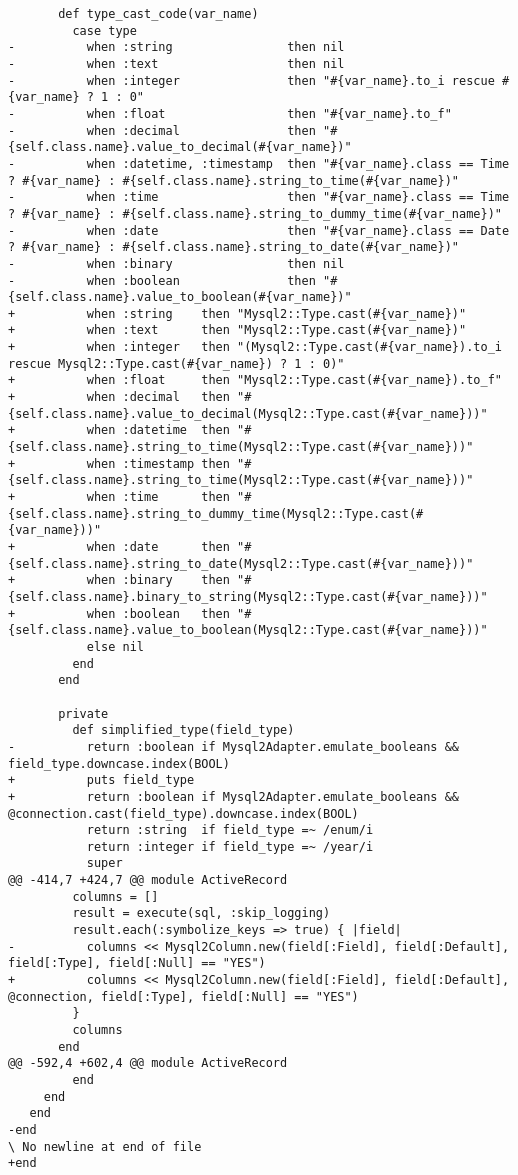 \begin{lstlisting}
       def type_cast_code(var_name)
         case type
-          when :string                then nil
-          when :text                  then nil
-          when :integer               then "#{var_name}.to_i rescue #{var_name} ? 1 : 0"
-          when :float                 then "#{var_name}.to_f"
-          when :decimal               then "#{self.class.name}.value_to_decimal(#{var_name})"
-          when :datetime, :timestamp  then "#{var_name}.class == Time ? #{var_name} : #{self.class.name}.string_to_time(#{var_name})"
-          when :time                  then "#{var_name}.class == Time ? #{var_name} : #{self.class.name}.string_to_dummy_time(#{var_name})"
-          when :date                  then "#{var_name}.class == Date ? #{var_name} : #{self.class.name}.string_to_date(#{var_name})"
-          when :binary                then nil
-          when :boolean               then "#{self.class.name}.value_to_boolean(#{var_name})"
+          when :string    then "Mysql2::Type.cast(#{var_name})"
+          when :text      then "Mysql2::Type.cast(#{var_name})"
+          when :integer   then "(Mysql2::Type.cast(#{var_name}).to_i rescue Mysql2::Type.cast(#{var_name}) ? 1 : 0)"
+          when :float     then "Mysql2::Type.cast(#{var_name}).to_f"
+          when :decimal   then "#{self.class.name}.value_to_decimal(Mysql2::Type.cast(#{var_name}))"
+          when :datetime  then "#{self.class.name}.string_to_time(Mysql2::Type.cast(#{var_name}))"
+          when :timestamp then "#{self.class.name}.string_to_time(Mysql2::Type.cast(#{var_name}))"
+          when :time      then "#{self.class.name}.string_to_dummy_time(Mysql2::Type.cast(#{var_name}))"
+          when :date      then "#{self.class.name}.string_to_date(Mysql2::Type.cast(#{var_name}))"
+          when :binary    then "#{self.class.name}.binary_to_string(Mysql2::Type.cast(#{var_name}))"
+          when :boolean   then "#{self.class.name}.value_to_boolean(Mysql2::Type.cast(#{var_name}))"
           else nil
         end
       end
 
       private
         def simplified_type(field_type)
-          return :boolean if Mysql2Adapter.emulate_booleans && field_type.downcase.index(BOOL)
+          puts field_type
+          return :boolean if Mysql2Adapter.emulate_booleans && @connection.cast(field_type).downcase.index(BOOL)
           return :string  if field_type =~ /enum/i
           return :integer if field_type =~ /year/i
           super
@@ -414,7 +424,7 @@ module ActiveRecord
         columns = []
         result = execute(sql, :skip_logging)
         result.each(:symbolize_keys => true) { |field|
-          columns << Mysql2Column.new(field[:Field], field[:Default], field[:Type], field[:Null] == "YES")
+          columns << Mysql2Column.new(field[:Field], field[:Default], @connection, field[:Type], field[:Null] == "YES")
         }
         columns
       end
@@ -592,4 +602,4 @@ module ActiveRecord
         end
     end
   end
-end
\ No newline at end of file
+end
\end{lstlisting}
